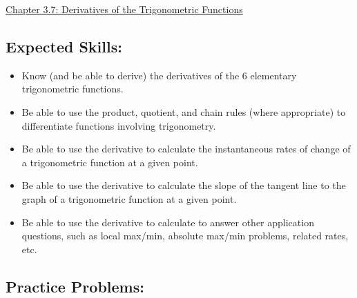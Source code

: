 \documentclass[12pt]{article}
\begin{document}
\begin{center}
\underline{\LARGE{Chapter 3.7: Derivatives of the Trigonometric Functions}}
\end{center}

\subsection*{Expected Skills:}

\begin{itemize}

\item Know (and be able to derive) the derivatives of the 6 elementary trigonometric functions.

\item Be able to use the product, quotient, and chain rules (where appropriate) to differentiate functions involving trigonometry.

\item Be able to use the derivative to calculate the instantaneous rates of change of a trigonometric function at a given point.

\item Be able to use the derivative to calculate the slope of the tangent line to the graph of a trigonometric function at a given point.

\item Be able to use the derivative to calculate to answer other application questions, such as local max/min, absolute max/min problems, related rates, etc.

\end{itemize}

\subsection*{Practice Problems: }
\end{document}
